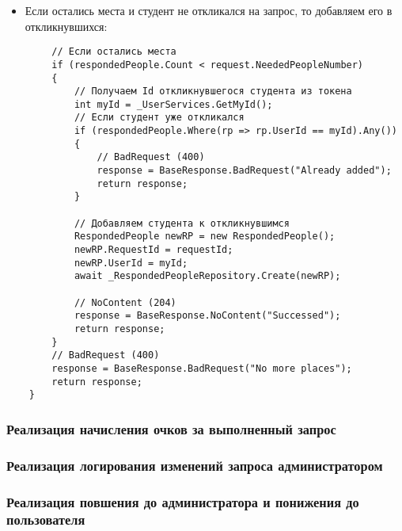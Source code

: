 \begin{itemize}
	\item{Если остались места и студент не откликался на запрос, то добавляем его в откликнувшихся:}
\end{itemize}
\begin{verbatim}
        // Если остались места
        if (respondedPeople.Count < request.NeededPeopleNumber)
        {
            // Получаем Id откликнувшегося студента из токена
            int myId = _UserServices.GetMyId();
            // Если студент уже откликался
            if (respondedPeople.Where(rp => rp.UserId == myId).Any())
            {
                // BadRequest (400)
                response = BaseResponse.BadRequest("Already added");
                return response;
            }

            // Добавляем студента к откликнувшимся
            RespondedPeople newRP = new RespondedPeople();
            newRP.RequestId = requestId;
            newRP.UserId = myId;
            await _RespondedPeopleRepository.Create(newRP);

            // NoContent (204)
            response = BaseResponse.NoContent("Successed");
            return response;
        }
        // BadRequest (400)
        response = BaseResponse.BadRequest("No more places");
        return response;
    }
\end{verbatim}

\subsubsection{Реализация начисления очков за выполненный запрос}

\subsubsection{Реализация логирования изменений запроса администратором}

\subsubsection{Реализация повшения до администратора и понижения до пользователя}
